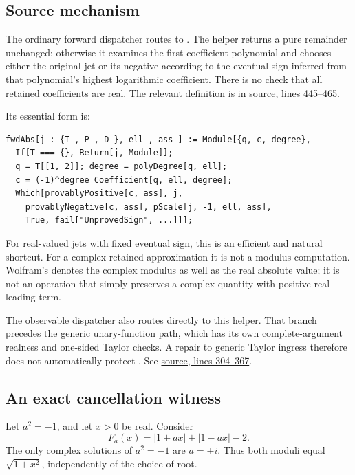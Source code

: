 \documentclass[11pt,letterpaper]{article}
\newcommand{\src}[3]{\href{https://github.com/VladimirReshetnikov/Asymptotic/blob/8e859961d7d37f008b826f3a8cad406460271614/#1\#L#2-L#3}{source, lines #2--#3}}
\newcommand{\code}[1]{\texttt{\detokenize{#1}}}
\begin{document}
\subsection{Source mechanism}

The ordinary forward dispatcher routes \code{Abs} to \code{fwdAbs}. The helper returns a pure remainder unchanged; otherwise it examines the first coefficient polynomial and chooses either the original jet or its negative according to the eventual sign inferred from that polynomial's highest logarithmic coefficient. There is no check that all retained coefficients are real.\cite{core} The relevant definition is in \src{src/Kernel/AsymptoticAnalysis.wl}{445}{465}.

Its essential form is:
\begin{lstlisting}
fwdAbs[j : {T_, P_, D_}, ell_, ass_] := Module[{q, c, degree},
  If[T === {}, Return[j, Module]];
  q = T[[1, 2]]; degree = polyDegree[q, ell];
  c = (-1)^degree Coefficient[q, ell, degree];
  Which[provablyPositive[c, ass], j,
    provablyNegative[c, ass], pScale[j, -1, ell, ass],
    True, fail["UnprovedSign", ...]]];
\end{lstlisting}

For real-valued jets with fixed eventual sign, this is an efficient and natural shortcut. For a complex retained approximation it is not a modulus computation. Wolfram's \code{Abs} denotes the complex modulus as well as the real absolute value; it is not an operation that simply preserves a complex quantity with positive real leading term.\cite{absdoc}

The observable dispatcher also routes \code{Abs} directly to this helper. That branch precedes the generic unary-function path, which has its own complete-argument realness and one-sided Taylor checks. A repair to generic Taylor ingress therefore does not automatically protect \code{Abs}.\cite{operations} See \src{src/Kernel/SeriesOperations.wl}{304}{367}.

\subsection{An exact cancellation witness}

Let $a^2=-1$, and let $x>0$ be real. Consider
\begin{equation}\label{eq:abswitness}
 F_a(x)=|1+a x|+|1-a x|-2.
\end{equation}
The only complex solutions of $a^2=-1$ are $a=\pm i$. Thus both moduli equal $\sqrt{1+x^2}$, independently of the choice of root.
\end{document}
